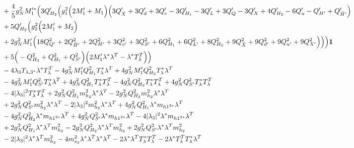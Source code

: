 {\begin{align}
 &+\frac{4}{5} g_{N}^{2} M_1'^* \Big(3 Q_{H_2}' \Big(g_{1}^{2} \Big(2 M_1'  + M_1\Big)\Big(3 Q_{\bar{X}}'  + 3 Q_d'  + 3 Q_e'  -3 Q_{H_1}'  -3 Q_L'  + 3 Q_Q'  -3 Q_X'  + 4 Q_{H_2}'  -6 Q_u'  - Q_{H'}'  + Q_{\bar{H}'}'\Big)\nonumber \\ 
 &+5 Q_{H_2}' \Big(g_{2}^{2} \Big(2 M_1'  + M_2\Big)\nonumber \\ 
 &+2 g_{N}^{2} M_1' \Big(18 Q_{Q'}^{2}  + 2 Q_{\bar{H}'}^{2}  + 2 Q_{H'}^{2}  + 3 Q_{e'}^{2}  + 3 Q_{S'}^{2}  + 6 Q_{H_1}^{2}  + 6 Q_{L'}^{2}  + 8 Q_{H_2}^{2}  + 9 Q_{\bar{X}}^{2}  + 9 Q_{d'}^{2}  + 9 Q_{u'}^{2}  + 9 Q_{X'}^{2} \Big)\Big)\Big){\bf 1} \nonumber \\ 
 &+5 \Big(- Q_{H_2}^{2}  + Q_{H_1}^{2} + Q_{S'}^{2}\Big)\Big(2 M_1' {\lambda^*  \lambda^{T}}  - {\lambda^*  T_{\lambda}^{T}} \Big)\Big)\nonumber \\ 
 &-4 \lambda_3 T_{{\lambda,3}^*} {\lambda^*  T_{\lambda}^{T}} -4 g_{N}^{2} M_1' Q_{H_1}^{2} {T_{\lambda}^*  \lambda^{T}} +4 g_{N}^{2} M_1' Q_{H_2}^{2} {T_{\lambda}^*  \lambda^{T}} \nonumber \\ 
 &-4 g_{N}^{2} M_1' Q_{S'}^{2} {T_{\lambda}^*  \lambda^{T}} +4 g_{N}^{2} Q_{H_1}^{2} {T_{\lambda}^*  T_{\lambda}^{T}} -4 g_{N}^{2} Q_{H_2}^{2} {T_{\lambda}^*  T_{\lambda}^{T}} +4 g_{N}^{2} Q_{S'}^{2} {T_{\lambda}^*  T_{\lambda}^{T}} \nonumber \\ 
 &-4 |\lambda_3|^2 {T_{\lambda}^*  T_{\lambda}^{T}} +2 g_{N}^{2} Q_{H_1}^{2} {m_{h_2}^2  \lambda^*  \lambda^{T}} -2 g_{N}^{2} Q_{H_2}^{2} {m_{h_2}^2  \lambda^*  \lambda^{T}} \nonumber \\ 
 &+2 g_{N}^{2} Q_{S'}^{2} {m_{h_2}^2  \lambda^*  \lambda^{T}} -2 |\lambda_3|^2 {m_{h_2}^2  \lambda^*  \lambda^{T}} +4 g_{N}^{2} Q_{H_1}^{2} {\lambda^*  m_{{h 1}^{2 *}}  \lambda^{T}} \nonumber \\ 
 &-4 g_{N}^{2} Q_{H_2}^{2} {\lambda^*  m_{{h 1}^{2 *}}  \lambda^{T}} +4 g_{N}^{2} Q_{S'}^{2} {\lambda^*  m_{{h 1}^{2 *}}  \lambda^{T}} -4 |\lambda_3|^2 {\lambda^*  m_{{h 1}^{2 *}}  \lambda^{T}} \nonumber \\ 
 &+2 g_{N}^{2} Q_{H_1}^{2} {\lambda^*  \lambda^{T}  m_{h_2}^2} -2 g_{N}^{2} Q_{H_2}^{2} {\lambda^*  \lambda^{T}  m_{h_2}^2} +2 g_{N}^{2} Q_{S'}^{2} {\lambda^*  \lambda^{T}  m_{h_2}^2} \nonumber \\ 
 &-2 |\lambda_3|^2 {\lambda^*  \lambda^{T}  m_{h_2}^2} -4 m_{s_3}^2 {\lambda^*  \lambda^{T}  \lambda^*  \lambda^{T}} -2 {\lambda^*  \lambda^{T}  T_{\lambda}^*  T_{\lambda}^{T}} -2 {\lambda^*  T_{\lambda}^{T}  T_{\lambda}^*  \lambda^{T}} \nonumber \\ 

\end{align}}
